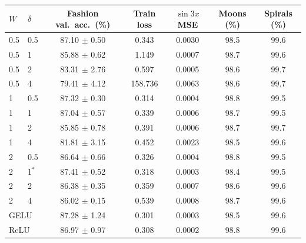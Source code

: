 \begin{tabular}{llccccc}
\toprule
$W$ & $\delta$ & Fashion val.\ acc.\ (\%) & Train loss & $\sin 3x$ MSE & Moons (\%) & Spirals (\%) \\
\midrule
0.5 & 0.5 & 87.10 $\pm$ 0.50 & 0.343 & 0.0030 & 98.5 & 99.6 \\
0.5 & 1 & 85.88 $\pm$ 0.62 & 1.149 & 0.0007 & 98.7 & 99.6 \\
0.5 & 2 & 83.31 $\pm$ 2.76 & 0.597 & 0.0005 & 98.6 & 99.7 \\
0.5 & 4 & 79.41 $\pm$ 4.12 & 158.736 & 0.0063 & 98.6 & 99.7 \\
1 & 0.5 & 87.32 $\pm$ 0.30 & 0.314 & 0.0004 & 98.8 & 99.5 \\
1 & 1 & 87.04 $\pm$ 0.57 & 0.339 & 0.0006 & 98.7 & 99.5 \\
1 & 2 & 85.85 $\pm$ 0.78 & 0.391 & 0.0006 & 98.7 & 99.7 \\
1 & 4 & 81.81 $\pm$ 3.15 & 0.452 & 0.0023 & 98.5 & 99.6 \\
2 & 0.5 & 86.64 $\pm$ 0.66 & 0.326 & 0.0004 & 98.8 & 99.5 \\
2 & 1$^\ast$ & 87.41 $\pm$ 0.52 & 0.318 & 0.0003 & 98.4 & 99.5 \\
2 & 2 & 86.38 $\pm$ 0.35 & 0.359 & 0.0007 & 98.6 & 99.6 \\
2 & 4 & 86.02 $\pm$ 0.15 & 0.539 & 0.0008 & 98.7 & 99.6 \\
\midrule
\multicolumn{2}{l}{GELU} & 87.28 $\pm$ 1.24 & 0.301 & 0.0003 & 98.5 & 99.6 \\
\multicolumn{2}{l}{ReLU} & 86.97 $\pm$ 0.97 & 0.308 & 0.0002 & 98.8 & 99.6 \\
\bottomrule
\end{tabular}
